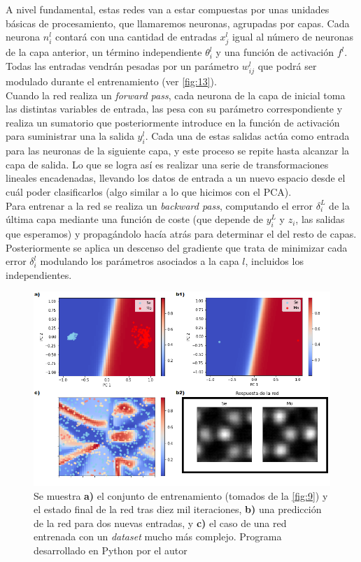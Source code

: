 A nivel fundamental, estas redes van a estar compuestas por unas unidades básicas de procesamiento, que llamaremos neuronas, agrupadas por capas. Cada neurona $n_i^l$ contará con una cantidad de entradas $x_j^l$ igual al número de neuronas de la capa anterior, un término independiente $\theta_i^l$ y una función de activación $f^l$. Todas las entradas vendrán pesadas por un parámetro $w_{ij}^l$ que podrá ser modulado durante el entrenamiento (ver \autoref{fig:13}).\\

Cuando la red realiza un \textit{forward pass}, cada neurona de la capa de inicial toma las distintas variables de entrada, las pesa con su parámetro correspondiente y realiza un sumatorio que posteriormente introduce en la función de activación para suministrar una la salida $y_i^l$. Cada una de estas salidas actúa como entrada para las neuronas de la siguiente capa, y este proceso se repite hasta alcanzar la capa de salida. Lo que se logra así es realizar una serie de transformaciones lineales encadenadas, llevando los datos de entrada a un nuevo espacio desde el cuál poder clasificarlos (algo similar a lo que hicimos con el PCA).\\

\newpage
Para entrenar a la red se realiza un \textit{backward pass}, computando el error $\delta_i^L $ de la última capa mediante una función de coste (que depende de $y_i^L$ y $z_i$, las salidas que esperamos) y propagándolo hacía atrás para determinar el del resto de capas. Posteriormente se aplica un descenso del gradiente que trata de minimizar cada error $\delta_i^l$ modulando los parámetros asociados a la capa $l$, incluidos los independientes.\\

\begin{figure}[h!]
    \centering
    \includegraphics[width=1\textwidth]{fig/Fig14.png}
    \caption{Se muestra \textbf{a)} el conjunto de entrenamiento (tomados de la \ref{fig:9}) y el estado final de la red tras diez mil iteraciones, \textbf{b)} una predicción de la red para dos nuevas entradas, y \textbf{c)} el caso de una red entrenada con un \textit{dataset} mucho más complejo. Programa desarrollado en Python por el autor \cite{repo}}
    \label{fig:14}
\end{figure}

